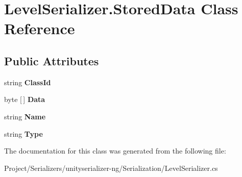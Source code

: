 \hypertarget{class_level_serializer_1_1_stored_data}{}\section{Level\+Serializer.\+Stored\+Data Class Reference}
\label{class_level_serializer_1_1_stored_data}
\subsection*{Public Attributes}
\begin{DoxyCompactItemize}
\item 
\mbox{\label{class_level_serializer_1_1_stored_data_a0ab54247f9b48b18670bfe8e2ce69e36}} 
string {\bfseries Class\+Id}
\item 
\mbox{\label{class_level_serializer_1_1_stored_data_a5fcb63be7929e28ef3ed5049f51f5d90}} 
byte \mbox{[}$\,$\mbox{]} {\bfseries Data}
\item 
\mbox{\label{class_level_serializer_1_1_stored_data_acd037ada2df660fcd362ca653762579c}} 
string {\bfseries Name}
\item 
\mbox{\label{class_level_serializer_1_1_stored_data_afb1907084ca13d38d47d397f1a0cddd2}} 
string {\bfseries Type}
\end{DoxyCompactItemize}


The documentation for this class was generated from the following file\+:\begin{DoxyCompactItemize}
\item 
Project/\+Serializers/unityserializer-\/ng/\+Serialization/Level\+Serializer.\+cs\end{DoxyCompactItemize}
